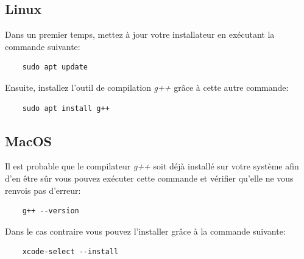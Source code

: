 \subsection{Linux}
Dans un premier temps, mettez à jour votre installateur en exécutant la commande suivante:
\begin{lstlisting}
	sudo apt update
\end{lstlisting}
Ensuite, installez l'outil de compilation \emph{g++} grâce à cette autre commande:
\begin{lstlisting}
	sudo apt install g++
\end{lstlisting}


\subsection{MacOS}
Il est probable que le compilateur \emph{g++} soit déjà installé sur votre système afin d'en être sûr vous pouvez exécuter cette commande et vérifier qu'elle ne vous renvois pas d'erreur:
\begin{lstlisting}
	g++ --version
\end{lstlisting}
Dans le cas contraire vous pouvez l'installer grâce à la commande suivante:
\begin{lstlisting}
	xcode-select --install
\end{lstlisting}